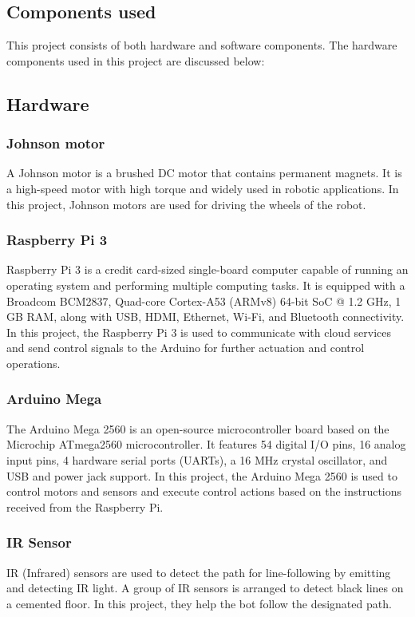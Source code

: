 \subsection{Components used}
This project consists of both hardware and software components. The hardware components used in this project are discussed below:
\subsection{Hardware}
\subsubsection{Johnson motor}
A Johnson motor is a brushed DC motor that contains permanent magnets. It is a high-speed motor with high torque and widely used in robotic applications. In this project, Johnson motors are used for driving the wheels of the robot.

\subsubsection{Raspberry Pi 3}
Raspberry Pi 3 is a credit card-sized single-board computer capable of running an operating system and performing multiple computing tasks. It is equipped with a Broadcom BCM2837, Quad-core Cortex-A53 (ARMv8) 64-bit SoC @ 1.2 GHz, 1 GB RAM, along with USB, HDMI, Ethernet, Wi-Fi, and Bluetooth connectivity.
In this project, the Raspberry Pi 3 is used to  communicate with cloud services and send control signals to the Arduino for further actuation and control operations.



\subsubsection{Arduino Mega}
The Arduino Mega 2560 is an open-source microcontroller board based on the Microchip ATmega2560 microcontroller. It features 54 digital I/O pins, 16 analog input pins, 4 hardware serial ports (UARTs), a 16 MHz crystal oscillator, and USB and power jack support.
In this project, the Arduino Mega 2560 is used to control motors and sensors and execute control actions based on the instructions received from the Raspberry Pi.


\subsubsection{IR Sensor}
IR (Infrared) sensors are used to detect the path for line-following by emitting and detecting IR light. A group of IR sensors is arranged to detect black lines on a cemented floor. In this project, they help the bot follow the designated path.

